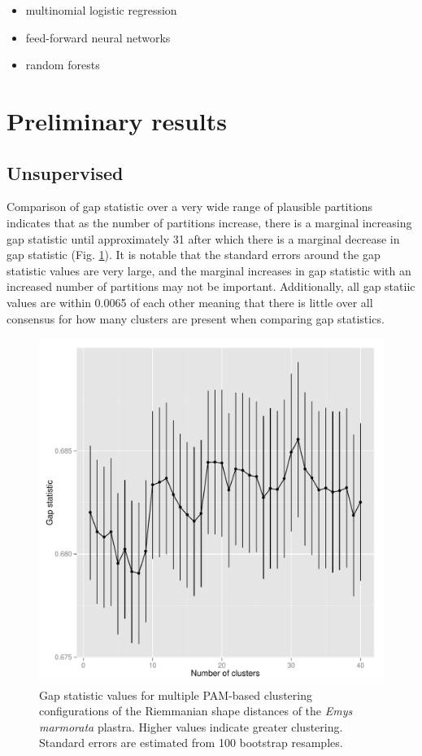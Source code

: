 \documentclass{article}\usepackage{graphicx, color}
\begin{document}
\begin{itemize}
  \item multinomial logistic regression
  \item feed-forward neural networks
  \item random forests
\end{itemize}


\section{Preliminary results}
\subsection{Unsupervised}
Comparison of gap statistic over a very wide range of plausible partitions indicates that as the number of partitions increase, there is a marginal increasing gap statistic until approximately 31 after which there is a marginal decrease in gap statistic (Fig. \ref{fig:gap}). It is notable that the standard errors around the gap statistic values are very large, and the marginal increases in gap statistic with an increased number of partitions may not be important. Additionally, all gap statiic values are within 0.0065 of each other meaning that there is little over all consensus for how many clusters are present when comparing gap statistics.



\begin{figure}[ht]
  \centering
  \includegraphics[width = \textwidth, keepaspectratio = true]{figure/gap}
  \caption{Gap statistic values for multiple PAM-based clustering configurations of the Riemmanian shape distances of the \textit{Emys marmorata} plastra. Higher values indicate greater clustering. Standard errors are estimated from 100 bootstrap resamples.}
  \label{fig:gap}
\end{figure}
\end{document}
